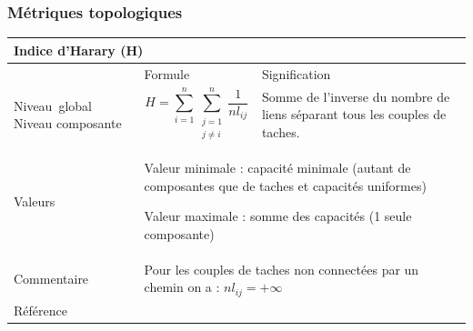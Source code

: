 \documentclass{article}
\begin{document}
\subsubsection{Métriques topologiques}

\begin{table}[H]
\begin{tabular}{|m{3.24cm}|m{4.4810004cm}m{7.924cm}|}

\hline
\multicolumn{3}{|m{16.044998cm}|}{Indice d’Harary (H)}\\\hline
 &
\multicolumn{1}{m{4.4810004cm}|}{Formule} &
Signification\\\hline
Niveau~global  Niveau composante &
\multicolumn{1}{m{4.4810004cm}|}{\begin{equation*}
H=\sum _{i=1}^{n}{\sum _{\begin{matrix}j=1\\j{\neq}i\end{matrix}}^{n}{\frac{1}{{\mathit{nl}}_{\mathit{ij}}}}}
\end{equation*}
} &
Somme de l’inverse du nombre de liens séparant tous les couples de taches.

\\\hline
Valeurs &
\multicolumn{2}{m{12.6050005cm}|}{Valeur minimale : capacité minimale (autant de composantes que de taches et capacités uniformes)

Valeur maximale : somme des capacités (1 seule composante)

}\\\hline
Commentaire &
\multicolumn{2}{m{12.6050005cm}|}{Pour les couples de taches non connectées par un chemin on a :   ${\mathit{nl}}_{\mathit{ij}}=+{\infty}$}\\\hline
Référence &
\multicolumn{2}{m{12.6050005cm}|}{\cite{Ricotta2000}}\\\hline
\end{tabular}
\end{table}
\end{document}
